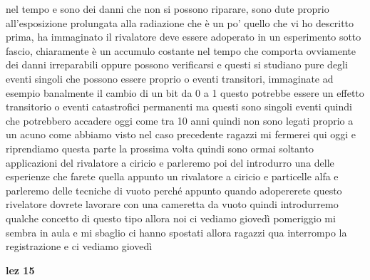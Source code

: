 nel tempo e sono dei danni che non si possono riparare, sono dute proprio all'esposizione prolungata alla radiazione che è un po' quello che vi ho descritto prima, ha immaginato il rivalatore deve essere adoperato in un esperimento sotto fascio, chiaramente è un accumulo costante nel tempo che comporta ovviamente dei danni irreparabili oppure possono verificarsi e questi si studiano pure degli eventi singoli che possono essere proprio o eventi transitori, immaginate ad esempio banalmente il cambio di un bit da 0 a 1 questo potrebbe essere un effetto transitorio o eventi catastrofici permanenti ma questi sono singoli eventi quindi che potrebbero accadere oggi come tra 10 anni quindi non sono legati proprio a un acuno come abbiamo visto nel caso precedente ragazzi mi fermerei qui oggi e riprendiamo questa parte la prossima volta quindi sono ormai soltanto applicazioni del rivalatore a ciricio e parleremo poi del introdurro una delle esperienze che farete quella appunto un rivalatore a ciricio e particelle alfa e parleremo delle tecniche di vuoto perché appunto quando adopererete questo rivelatore dovrete lavorare con una cameretta da vuoto quindi introdurremo qualche concetto di questo tipo allora noi ci vediamo giovedì pomeriggio mi sembra in aula e mi sbaglio ci hanno spostati allora ragazzi qua interrompo la registrazione e ci vediamo giovedì

\textbf{lez 15}

